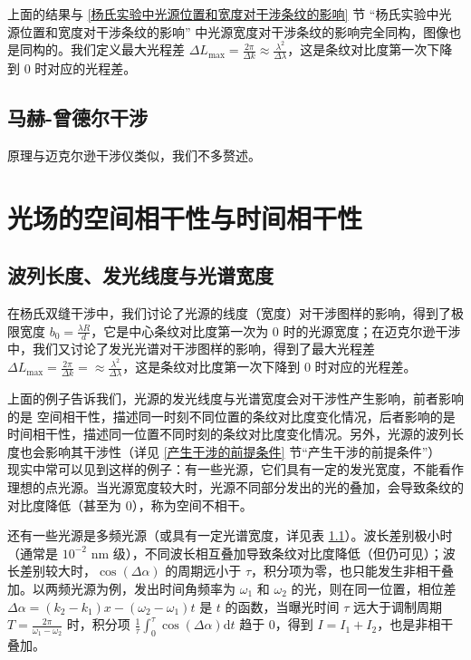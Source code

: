 \documentclass[UTF8]{report}
\theoremstyle{MyLineTheoremStyle} %
\theoremstyle{MyBlockTheoremStyle} %
\theoremstyle{MySubsubsectionStyle} %
\begin{document}
上面的结果与 \ref{杨氏实验中光源位置和宽度对干涉条纹的影响} 节 “杨氏实验中光源位置和宽度对干涉条纹的影响” 中光源宽度对干涉条纹的影响完全同构，图像也是同构的。我们定义最大光程差 $\Delta L_{\max} = \frac{2 \pi}{\Delta k} \approx \frac{\lambda^2}{\Delta \lambda}$，这是条纹对比度第一次下降到 0 时对应的光程差。

\subsection{马赫-曾德尔干涉}

原理与迈克尔逊干涉仪类似，我们不多赘述。

\section{光场的空间相干性与时间相干性}\label{光场的空间相干性与时间相干性}

\subsection{波列长度、发光线度与光谱宽度}

在杨氏双缝干涉中，我们讨论了光源的线度（宽度）对干涉图样的影响，得到了极限宽度 $b_0 = \frac{\lambda R}{d}$，它是中心条纹对比度第一次为 0 时的光源宽度；在迈克尔逊干涉中，我们又讨论了发光光谱对干涉图样的影响，得到了最大光程差 $\Delta L_{\max} = \frac{2 \pi}{\Delta k} = \approx \frac{\lambda^2}{\Delta \lambda}$，这是条纹对比度第一次下降到 0 时对应的光程差。

上面的例子告诉我们，光源的发光线度与光谱宽度会对干涉性产生影响，前者影响的是 {\color{red} 空间相干性}，描述同一时刻不同位置的条纹对比度变化情况，后者影响的是 {\color{red} 时间相干性}，描述同一位置不同时刻的条纹对比度变化情况。另外，光源的波列长度也会影响其干涉性（详见 \ref{产生干涉的前提条件} 节“产生干涉的前提条件”）
\\

现实中常可以见到这样的例子：有一些光源，它们具有一定的发光宽度，不能看作理想的点光源。当光源宽度较大时，光源不同部分发出的光的叠加，会导致条纹的对比度降低（甚至为 0），称为空间不相干。

还有一些光源是多频光源（或具有一定光谱宽度，详见表 \ref{}）。波长差别极小时（通常是 $10^{-2}$ nm 级），不同波长相互叠加导致条纹对比度降低（但仍可见）；波长差别较大时，$\cos(\Delta \alpha)$ 的周期远小于 $\tau$，积分项为零，也只能发生非相干叠加。以两频光源为例，发出时间角频率为 $\omega_1$ 和 $\omega_2$ 的光，则在同一位置，相位差 $\Delta \alpha = (k_2 - k_1)x - (\omega_2 - \omega_1)t$ 是 $t$ 的函数，当曝光时间 $\tau$ 远大于调制周期 $T = \frac{2 \pi}{\omega_1 - \omega_2}$ 时，积分项 $\frac{1}{\tau}\int_{0}^{\tau}  \cos(\Delta \alpha) \mathrm{d} t$ 趋于 0，得到 $I = I_1 + I_2$，也是非相干叠加。
\end{document}
